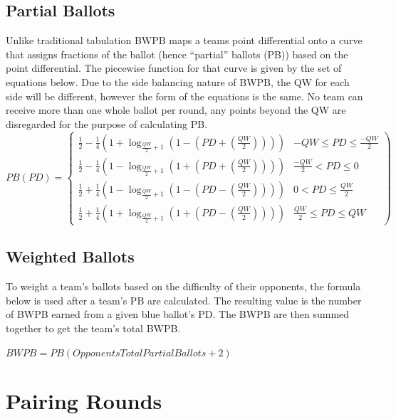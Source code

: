 \documentclass{article}
\begin{document}
\subsection{Partial Ballots}
Unlike traditional tabulation BWPB maps a teams point differential onto a curve that assigns fractions of the ballot (hence ``partial'' ballots (PB)) based on the point differential. The piecewise function for that curve is given by the set of equations below. Due to the side balancing nature of BWPB, the QW for each side will be different, however the form of the equations is the same. No team can receive more than one whole ballot per round, any points beyond the QW are disregarded for the purpose of calculating PB.\\
\begin{displaymath}
   PB(PD) = \left\{
     \begin{array}{lr}
       \frac{1}{2}-\frac{1}{4}\left(1+\log_{\frac{QW}{2}+1}\left(1-\left(PD+\left(\frac{QW}{2}\right)\right)\right)\right) &  -QW\le PD\le \frac{-QW}{2}\\
       \frac{1}{2}-\frac{1}{4}\left(1-\log_{\frac{QW}{2}+1}\left(1+\left(PD+\left(\frac{QW}{2}\right)\right)\right)\right) &  \frac{-QW}{2}<PD\le 0\\
       \frac{1}{2}+\frac{1}{4}\left(1-\log_{\frac{QW}{2}+1}\left(1-\left(PD-\left(\frac{QW}{2}\right)\right)\right)\right) &  0<PD\le\frac{QW}{2}\\
       \frac{1}{2}+\frac{1}{4}\left(1+\log_{\frac{QW}{2}+1}\left(1+\left(PD-\left(\frac{QW}{2}\right)\right)\right)\right) & \frac{QW}{2}\le PD \le QW
     \end{array}
  \right)
\end{displaymath}
\subsection{Weighted Ballots}
To weight a team's ballots based on the difficulty of their opponents, the formula below is used after a team's PB are calculated. The resulting value is the number of BWPB earned from a given blue ballot's PD. The BWPB are then summed together to get the team's total BWPB.

\begin{center}
$BWPB=PB\left(OpponentsTotalPartialBallots+2\right)$
\end{center}

\section{Pairing Rounds}
\label{roundPairing}
\end{document}

